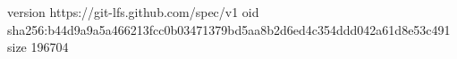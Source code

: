 version https://git-lfs.github.com/spec/v1
oid sha256:b44d9a9a5a466213fcc0b03471379bd5aa8b2d6ed4c354ddd042a61d8e53c491
size 196704
